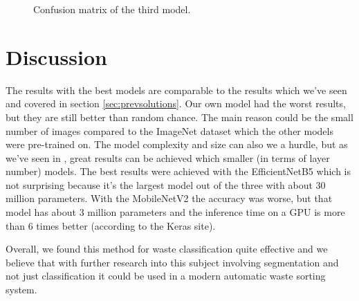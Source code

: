 \documentclass[twocolumn]{article}
\begin{document}
	\begin{figure}[htb]
		
		\centering
		\caption{Confusion matrix of the third model.}
		\label{fig:model3_conf}
	\end{figure}
	
	\section{Discussion}
	The results with the best models are comparable to the results which we've seen and covered in section \ref{sec:prevsolutions}.
	Our own model had the worst results, but they are still better than random chance. The main reason could be the small number of images compared to the ImageNet dataset which the other models were pre-trained on. The model complexity and size can also we a hurdle, but as we've seen in \cite{Chu2018}, great results can be achieved which smaller (in terms of layer number) models.
	The best results were achieved with the EfficientNetB5 which is not surprising because it's the largest model out of the three with about 30 million parameters. With the MobileNetV2 the accuracy was worse, but that model has about 3 million parameters and the inference time on a GPU is more than 6 times better (according to the Keras site).
	
	Overall, we found this method for waste classification quite effective and we believe that with further research into this subject involving segmentation and not just classification it could be used in a modern automatic waste sorting system.
	
	
	
	
\end{document}
